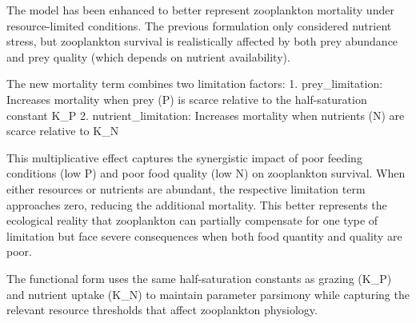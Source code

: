 The model has been enhanced to better represent zooplankton mortality under resource-limited conditions. The previous formulation only considered nutrient stress, but zooplankton survival is realistically affected by both prey abundance and prey quality (which depends on nutrient availability).

The new mortality term combines two limitation factors:
1. prey_limitation: Increases mortality when prey (P) is scarce relative to the half-saturation constant K_P
2. nutrient_limitation: Increases mortality when nutrients (N) are scarce relative to K_N

This multiplicative effect captures the synergistic impact of poor feeding conditions (low P) and poor food quality (low N) on zooplankton survival. When either resources or nutrients are abundant, the respective limitation term approaches zero, reducing the additional mortality. This better represents the ecological reality that zooplankton can partially compensate for one type of limitation but face severe consequences when both food quantity and quality are poor.

The functional form uses the same half-saturation constants as grazing (K_P) and nutrient uptake (K_N) to maintain parameter parsimony while capturing the relevant resource thresholds that affect zooplankton physiology.
